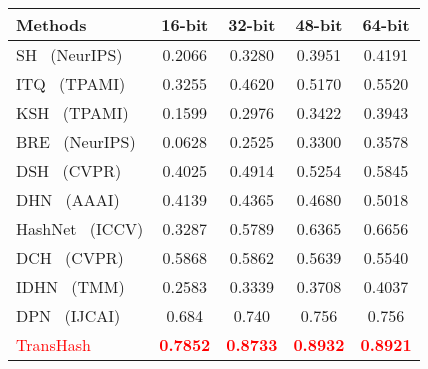   \begin{table}[!htpb]
    \centering
    \begin{tabular}{cccccc}
       \\ \hline
    \multicolumn{2}{l|}{Methods} & 16-bit & 32-bit & 48-bit & 64-bit   \\\hline
    \multicolumn{2}{l|}{SH~\cite{weiss2008spectral} (NeurIPS)} & 0.2066 & 0.3280  & 0.3951 & 0.4191  \\  
    \multicolumn{2}{l|}{ITQ~\cite{gong2012iterative} (TPAMI)} & 0.3255 & 0.4620 & 0.5170 & 0.5520  \\  
    \multicolumn{2}{l|}{KSH~\cite{liu2012supervised} (TPAMI)} & 0.1599 & 0.2976 & 0.3422 & 0.3943  \\  
    \multicolumn{2}{l|}{BRE~\cite{kulis2009learning} (NeurIPS)} & 0.0628 & 0.2525 & 0.3300 & 0.3578  \\  
    \hline
    \hline
    \multicolumn{2}{l|}{DSH~\cite{liu2016deep} (CVPR)} & 0.4025 & 0.4914 & 0.5254 & 0.5845  \\
    \multicolumn{2}{l|}{DHN~\cite{zhu2016deep} (AAAI)} & 0.4139 & 0.4365 & 0.4680 & 0.5018  \\
    \multicolumn{2}{l|}{HashNet~\cite{cao2017hashnet} (ICCV)} & 0.3287 & 0.5789 & 0.6365 & 0.6656  \\
    \multicolumn{2}{l|}{DCH~\cite{cao2018deep} (CVPR)} & 0.5868 & 0.5862 & 0.5639 & 0.5540  \\
    \multicolumn{2}{l|}{IDHN~\cite{cao2018deep} (TMM)} & 0.2583 & 0.3339 & 0.3708 & 0.4037  \\
    \multicolumn{2}{l|}{DPN~\cite{fan2020deep} (IJCAI)} & 0.684 & 0.740 & 0.756 & 0.756  \\
    \hline
    \hline
     \multicolumn{2}{l|}{\textcolor{red}{TransHash} }&\textcolor{red}{\textbf{0.7852}} & \textcolor{red}{\textbf{0.8733}} & \textcolor{red}{\textbf{0.8932}} & \textcolor{red}{\textbf{0.8921}} \\
     \hline
     \hline
    \end{tabular}
    \label{table:imagenet}
  \end{table}


